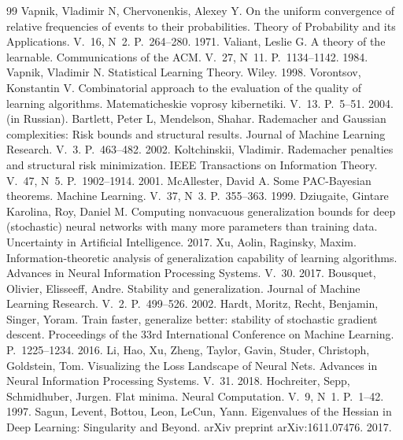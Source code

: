 \begin{thebibliography}{99}
 Vapnik, Vladimir N, Chervonenkis, Alexey Y. On the uniform convergence of relative frequencies of events to their probabilities. Theory of Probability and its Applications. V.~16, N~2. P.~264--280. 1971.
 Valiant, Leslie G. A theory of the learnable. Communications of the ACM. V.~27, N~11. P.~1134--1142. 1984.
 Vapnik, Vladimir N. Statistical Learning Theory. Wiley. 1998.
 Vorontsov, Konstantin V. Combinatorial approach to the evaluation of the quality of learning algorithms. Matematicheskie voprosy kibernetiki. V.~13. P.~5--51. 2004. (in Russian).
 Bartlett, Peter L, Mendelson, Shahar. Rademacher and Gaussian complexities: Risk bounds and structural results. Journal of Machine Learning Research. V.~3. P.~463--482. 2002.
 Koltchinskii, Vladimir. Rademacher penalties and structural risk minimization. IEEE Transactions on Information Theory. V.~47, N~5. P.~1902--1914. 2001.
 McAllester, David A. Some PAC-Bayesian theorems. Machine Learning. V.~37, N~3. P.~355--363. 1999.
 Dziugaite, Gintare Karolina, Roy, Daniel M. Computing nonvacuous generalization bounds for deep (stochastic) neural networks with many more parameters than training data. Uncertainty in Artificial Intelligence. 2017.
 Xu, Aolin, Raginsky, Maxim. Information-theoretic analysis of generalization capability of learning algorithms. Advances in Neural Information Processing Systems. V.~30. 2017.
 Bousquet, Olivier, Elisseeff, Andre. Stability and generalization. Journal of Machine Learning Research. V.~2. P.~499--526. 2002.
 Hardt, Moritz, Recht, Benjamin, Singer, Yoram. Train faster, generalize better: stability of stochastic gradient descent. Proceedings of the 33rd International Conference on Machine Learning. P.~1225--1234. 2016.
 Li, Hao, Xu, Zheng, Taylor, Gavin, Studer, Christoph, Goldstein, Tom. Visualizing the Loss Landscape of Neural Nets. Advances in Neural Information Processing Systems. V.~31. 2018.
 Hochreiter, Sepp, Schmidhuber, Jurgen. Flat minima. Neural Computation. V.~9, N~1. P.~1--42. 1997.
 Sagun, Levent, Bottou, Leon, LeCun, Yann. Eigenvalues of the Hessian in Deep Learning: Singularity and Beyond. arXiv preprint arXiv:1611.07476. 2017.

\end{thebibliography}
